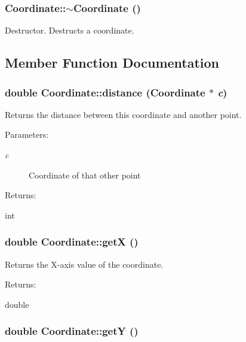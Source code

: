 \subsubsection{\setlength{\rightskip}{0pt plus 5cm}Coordinate::$\sim$Coordinate ()}\label{classCoordinate_a2}


Destructor. Destructs a coordinate. 

\subsection{Member Function Documentation}
\subsubsection{\setlength{\rightskip}{0pt plus 5cm}double Coordinate::distance (Coordinate $\ast$ {\em c})\hspace{0.3cm}{\tt  [inline]}}\label{classCoordinate_a7}


Returns the distance between this coordinate and another point. \begin{Desc}
\item[Parameters: ]\par
\begin{description}
\item[{\em 
c}]Coordinate of that other point \end{description}
\end{Desc}
\begin{Desc}
\item[Returns: ]\par
int \end{Desc}
\subsubsection{\setlength{\rightskip}{0pt plus 5cm}double Coordinate::get\-X ()\hspace{0.3cm}{\tt  [inline]}}\label{classCoordinate_a5}


Returns the X-axis value of the coordinate. \begin{Desc}
\item[Returns: ]\par
double \end{Desc}
\subsubsection{\setlength{\rightskip}{0pt plus 5cm}double Coordinate::get\-Y ()\hspace{0.3cm}{\tt  [inline]}}\label{classCoordinate_a6}


